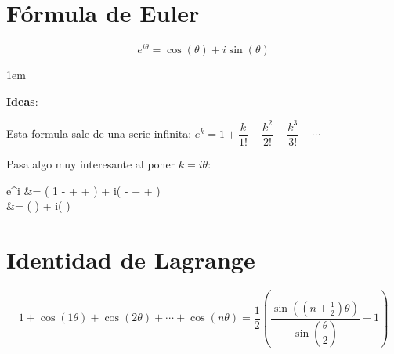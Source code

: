 \documentclass[12pt, fleqn]{report}                             %
\newenvironment{SmallIndentation}[1][0.75em]                    %
    {\begin{adjustwidth}{#1}{}\begin{footnotesize}}                 %
    {\end{footnotesize}\end{adjustwidth}}                           %
\newcommand{\Wrap}[1]{\left( #1 \right)}                        %
\newenvironment{MultiLineEquation*}[1]                          %
        {\begin{equation*}\begin{alignedat}{#1}}                    %
        {\end{alignedat}\end{equation*}}                            %
\newcommand{\Cos}[1]{\cos\Wrap{#1}}
\newcommand{\Sin}[1]{\sin\Wrap{#1}}
\begin{document}
        \clearpage
        \section{Fórmula de Euler}  

            \begin{equation}
                e^{i\theta} = \Cos{\theta} + i\Sin{\theta}
            \end{equation}

            \begin{SmallIndentation}[1em]
                \textbf{Ideas}:

                Esta formula sale de una serie infinita:
                $e^k = 1 + \dfrac{k}{1!} + \dfrac{k^2}{2!} + \dfrac{k^3}{3!} + \cdots$

                Pasa algo muy interesante al poner $k=i\theta$:
                \begin{MultiLineEquation*}{2}
                    e^{i\theta} &= 
                                \Wrap{1 -  +  + \cdots}
                                +
                                i\Wrap{\theta -  +  + \cdots} \\
                                &= \Cos{\theta} + i\Sin{\theta}
                \end{MultiLineEquation*}

            \end{SmallIndentation}

        


        \clearpage
        \section{Identidad de Lagrange}

            \begin{equation}
                1+\Cos{1\theta}+\Cos{2\theta}+\cdots+\Cos{n\theta}  = 
                    \dfrac{1}{2} \Wrap{\dfrac{\Sin{(n+\frac{1}{2})\theta}}{\Sin{\dfrac{\theta}{2}}}+1}
            \end{equation}
                
\end{document}
